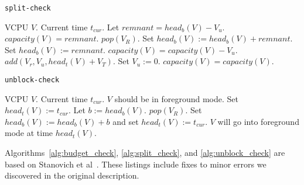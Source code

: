 \documentclass[twocolumn,10pt]{article}
\begin{document}
\begin{algorithm}[!htb]
  \caption{\tt split-check}
  \begin{algorithmic}[1]\algorithmsize
    \REQUIRE VCPU $V$.
    \REQUIRE Current time $t_{cur}$.
    \STATE Let $remnant=head_b(V)-V_u$.
    \ENSURE $capacity(V)=remnant$.
    \STATE $pop(V_R)$.
    \STATE Set $head_b(V):=head_b(V)+remnant$.
    \ELSE
    \STATE Set $head_b(V):=remnant$.
    \ENSURE $capacity(V)=capacity(V)-V_u$.
    \ENDIF
    \STATE $add(V_r, V_u, head_t(V)+V_T)$.
    \STATE Set $V_u:=0$.
    \ENSURE $capacity(V)=capacity(V)$.
    \ENDIF
  \end{algorithmic}
  \label{alg:split_check}
\end{algorithm}

\begin{algorithm}[!htb]
  \caption{\tt unblock-check}
  \begin{algorithmic}[1]\algorithmsize
    \REQUIRE VCPU $V$.
    \REQUIRE Current time $t_{cur}$.
    \STATE $V$ should be in foreground mode.
    \STATE Set $head_t(V):=t_{cur}$.
    \STATE Let $b:=head_b(V)$.
    \STATE $pop(V_R)$.
    \STATE Set $head_b(V):=head_b(V)+b$ and set $head_t(V):=t_{cur}$.
    \ELSE
    \RETURN
    \ENDIF
    \ENDWHILE
    \ELSE
    \STATE $V$ will go into foreground mode at time $head_t(V)$.
    \ENDIF
  \end{algorithmic}
  \label{alg:unblock_check}
\end{algorithm}

Algorithms~\ref{alg:budget_check}, \ref{alg:split_check}, and
\ref{alg:unblock_check} are based on Stanovich et
al~\cite{stanovich10}.  These listings include fixes to minor errors
we discovered in the original description.
\end{document}
